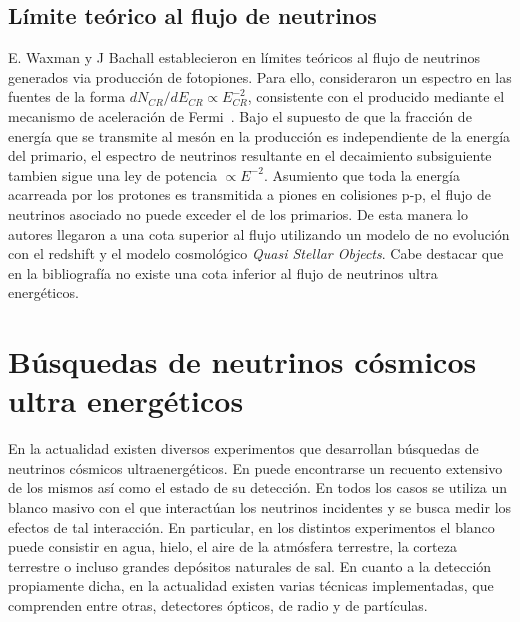 	\subsection{L\'imite te\'orico al flujo de neutrinos}
	
	E. Waxman y J Bachall establecieron en \cite{cite:WaxmanBahcall1} l\'imites te\'oricos al flujo de neutrinos generados via producci\'on de fotopiones.
	Para ello, consideraron un espectro en las fuentes de la forma $dN_{CR}/dE_{CR}\propto E_{CR}^{-2}$, consistente con el producido mediante el mecanismo de aceleraci\'on de Fermi~\cite{cite:Waxman1}.
	Bajo el supuesto de que la fracci\'on de energ\'ia que se transmite al mes\'on en la producci\'on es independiente de la energ\'ia del primario, el espectro de neutrinos resultante en el decaimiento subsiguiente tambien sigue una ley de potencia $\propto E^{-2}$.
	Asumiento que toda la energ\'ia acarreada por los protones es transmitida a piones en colisiones p-p, el flujo de neutrinos asociado no puede exceder el de los primarios.
	De esta manera lo autores llegaron a una cota superior al flujo utilizando un modelo de no evoluci\'on con el redshift y el modelo cosmol\'ogico \emph{Quasi Stellar Objects}.
	Cabe destacar que en la bibliograf\'ia no existe una cota inferior al flujo de neutrinos ultra energ\'eticos.
	
% 	
% 	
% 	

\section{Búsquedas de neutrinos cósmicos ultra energéticos}

En la actualidad existen diversos experimentos que desarrollan b\'usquedas de neutrinos c\'osmicos ultraenerg\'eticos. 
En \cite{cite:nuSearchReview1} puede encontrarse un recuento extensivo de los mismos as\'i como el estado de su detecci\'on. 
En todos los casos se utiliza un blanco masivo con el que interact\'uan los neutrinos incidentes y se busca medir los efectos de tal interacci\'on.
En particular, en los distintos experimentos el blanco puede consistir en agua, hielo, el aire de la atm\'osfera terrestre, la corteza terrestre o incluso grandes dep\'ositos naturales de sal.
En cuanto a la detecci\'on propiamente dicha, en la actualidad existen varias t\'ecnicas implementadas, que comprenden entre otras, detectores \'opticos, de radio y de part\'iculas.

